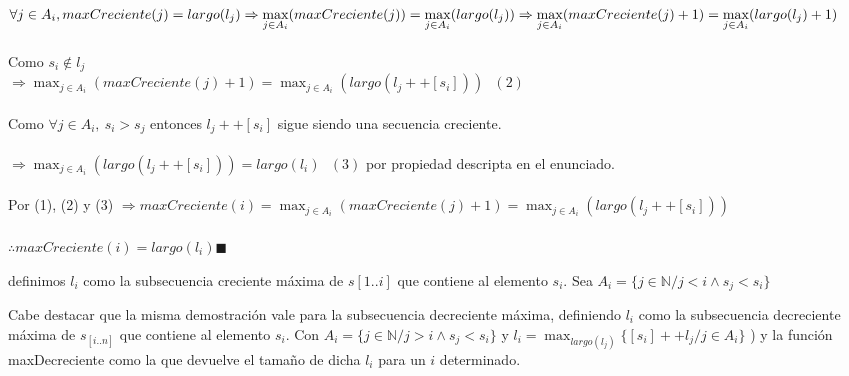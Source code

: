 $\displaystyle \forall j \in A_i , maxCreciente(j) = largo(l_j) \\
\\
 \Rightarrow \max_{j \in A_i}({maxCreciente(j)}) = \max_{j \in A_i}({largo(l_j)}) \\
 \\
 \Rightarrow \max_{j \in A_i}({maxCreciente(j) + 1}) = \max_{j \in A_i}({largo(l_j) + 1})$ \\
 \\
Como $s_i  \notin l_j$
\\
$\displaystyle \Rightarrow \max_{j \in A_i}({maxCreciente(j) + 1}) = \max_{j \in A_i}({largo(l_j ++ [s_i])}) \ \ \ (2)$ \\
\\
Como $\forall j \in A_i,\ s_i > s_j$ entonces $l_j ++ [s_i]$  sigue siendo una secuencia creciente.\\
\\
$\displaystyle \Rightarrow \max_{j \in A_i}({largo(l_j ++ [s_i])}) = largo(l_i)\ \ \ (3) $ por propiedad descripta en el enunciado. \\ 
\\
Por (1), (2) y (3)      
$\displaystyle \Rightarrow maxCreciente(i) = \max_{j \in A_i}({maxCreciente(j) + 1}) = \max_{j \in A_i}({largo(l_j ++ [s_i])})$ \\
\\
$\displaystyle \therefore maxCreciente(i) = largo(l_i) \blacksquare$ 

definimos $l_i$ como la subsecuencia creciente máxima 
de $s[1..i]$ que contiene al elemento $s_i$. Sea 
$A_i = \{ j \in \mathbb{N} / j < i \land s_j < s_i \}$

Cabe destacar que la misma demostración vale para la subsecuencia decreciente máxima, 
definiendo $l_i$ como la subsecuencia decreciente máxima de $s_[i..n]$ que contiene al elemento 
$s_i$. Con $A_i = \{ j \in \mathbb{N} / j > i \land s_j < s_i \}$ y 
 $\displaystyle l_i = \max_{largo(l_j)}\{ [s_i]++l_j  / j \in A_i\}$ ) y 
la función maxDecreciente como la que devuelve el tamaño de dicha $l_i$ para un $i$ determinado.

